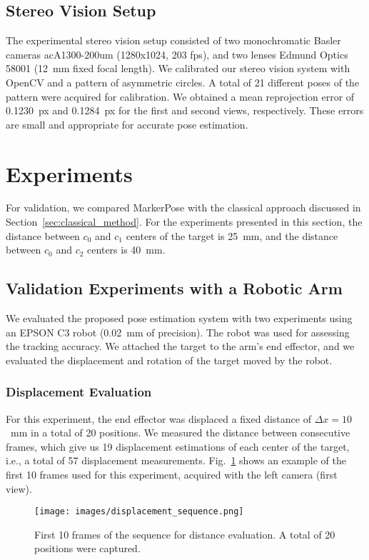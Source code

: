 \documentclass[final]{cvpr}
\begin{document}
\subsection{Stereo Vision Setup}
The experimental stereo vision setup consisted of two monochromatic Basler cameras acA1300-200um (1280x1024, 203 fps), and two lenses Edmund Optics 58001 (12~mm fixed focal length). We calibrated our stereo vision system with OpenCV and a pattern of asymmetric circles. A total of 21 different poses of the pattern were acquired for calibration. We obtained a mean reprojection error of 0.1230~px and 0.1284~px for the first and second views, respectively. These errors are small and appropriate for accurate pose estimation.




\section{Experiments}
For validation, we compared MarkerPose with the classical approach discussed in Section~\ref{sec:classical_method}. For the experiments presented in this section, the distance between $c_0$ and $c_1$ centers of the target is 25~mm, and the distance between $c_0$ and $c_2$ centers is 40~mm.


\subsection{Validation Experiments with a Robotic Arm}
We evaluated the proposed pose estimation system with two experiments using an EPSON C3 robot (0.02~mm of precision). The robot was used for assessing the tracking accuracy. We attached the target to the arm's end effector, and we evaluated the displacement and rotation of the target moved by the robot.


\subsubsection{Displacement Evaluation}
\label{sec:dist_experiment}
For this experiment, the end effector was displaced a fixed distance of $\Delta x = 10$~mm in a total of 20 positions. We measured the distance between consecutive frames, which give us 19 displacement estimations of each center of the target, i.e., a total of 57 displacement measurements. Fig.~\ref{fig:displacement_sequece} shows an example of the first 10 frames used for this experiment, acquired with the left camera (first view).

\begin{figure}[h]
    \centering
    \texttt{[image: images/displacement\_sequence.png]}
    \caption{First 10 frames of the sequence for distance evaluation. A total of 20 positions were captured.}
    \label{fig:displacement_sequece}
\end{figure}
\end{document}
